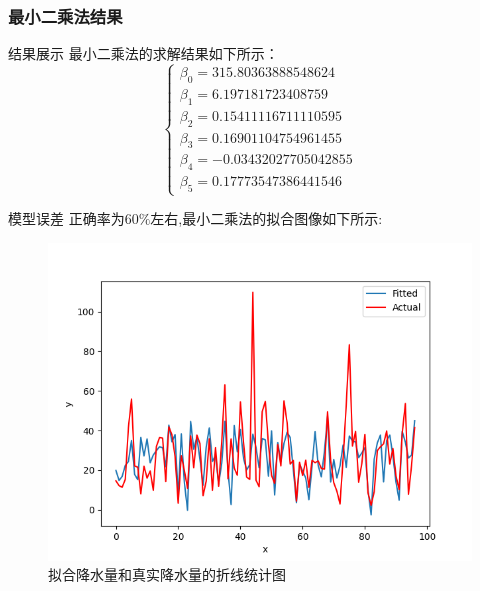 \documentclass[10pt]{beamer}
\begin{document}
\begin{frame}
	\frametitle{最小二乘法结果}
	\begin{block}{结果展示}
		最小二乘法的求解结果如下所示：
		\begin{equation}
			\begin{cases}
				\beta_0 = 315.80363888548624   \\
				\beta_1 = 6.197181723408759    \\
				\beta_2 = 0.15411116711110595  \\
				\beta_3 = 0.16901104754961455  \\
				\beta_4 = -0.03432027705042855 \\
				\beta_5 = 0.17773547386441546
			\end{cases}
		\end{equation}
	\end{block}
	\begin{block}{模型误差}
		正确率为$60\%$左右,最小二乘法的拟合图像如下所示:
		\begin{figure}[h!]
			\centering
			\includegraphics[scale=0.2]{fit2.png}
			\caption{拟合降水量和真实降水量的折线统计图}
		\end{figure}
	\end{block}
\end{frame}
\end{document}

